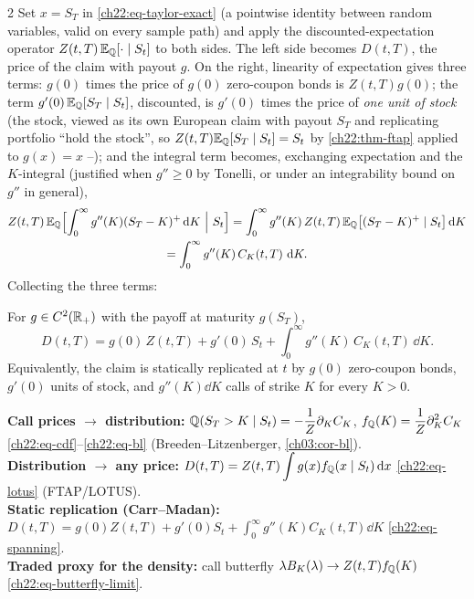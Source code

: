 \begin{paracol}{2}
Set $x=S_T$ in \eqref{ch22:eq-taylor-exact} (a pointwise identity between random variables, valid on
every sample path) and apply the discounted-expectation operator $Z(t,T)\,\mathbb{E}_{\mathbb{Q}}[\cdot\mid S_t]$ to both
sides. The left side becomes $D(t,T)$, the price of the claim with payout $g$. On the right,
linearity of expectation gives three terms: $g(0)$ times the price of $g(0)$ zero-coupon bonds is
$Z(t,T)g(0)$; the term $g'(0)\,\mathbb{E}_{\mathbb{Q}}[S_T\mid S_t]$, discounted, is $g'(0)$ times the price of \emph{one
unit of stock} (the stock, viewed as its own European claim with payout $S_T$ and replicating portfolio
``hold the stock'', so $Z(t,T)\mathbb{E}_{\mathbb{Q}}[S_T\mid S_t]=S_t$ by \cref{ch22:thm-ftap} applied to $g(x)=x$
--); and the integral term becomes, exchanging expectation and
the $K$-integral (justified when $g''\ge0$ by Tonelli, or under an integrability bound on $g''$ in
general),
\[
  \begin{gathered}
  Z(t,T)\,\E_\Q\Bigl[\int_0^\infty g''(K)(S_T-K)^+\dd K\ \Big|\ S_t\Bigr]
  = \int_0^\infty g''(K)\,Z(t,T)\,\E_\Q\bigl[(S_T-K)^+\mid S_t\bigr]\dd K \\
  = \int_0^\infty g''(K)\,C_K(t,T)\,\dd K.
  \end{gathered}
\]
Collecting the three terms:

\begin{theorem}\label{ch22:thm-spanning}
For $g\in C^2(\mathbb{R}_+)$ with the payoff at maturity $g(S_T)$,
\begin{equation}\label{ch22:eq-spanning}
  D(t,T) = g(0)\,Z(t,T) + g'(0)\,S_t + \int_0^\infty g''(K)\,C_K(t,T)\,\dd K.
\end{equation}
Equivalently, the claim is statically replicated at $t$ by $g(0)$ zero-coupon bonds, $g'(0)$ units of
stock, and $g''(K)\dd K$ calls of strike $K$ for every $K>0$.
\end{theorem}

\begin{keyformulas}
\textbf{Call prices $\to$ distribution:} $\displaystyle \mathbb{Q}(S_T>K\mid S_t)=-\frac1{Z}\partial_KC_K$,
\quad $\displaystyle f_{\mathbb{Q}}(K)=\frac1{Z}\partial^2_KC_K$ \eqref{ch22:eq-cdf}--\eqref{ch22:eq-bl}
(Breeden--Litzenberger, \cref{ch03:cor-bl}). \\
\textbf{Distribution $\to$ any price:} $\displaystyle D(t,T)=Z(t,T)\int g(x)f_{\mathbb{Q}}(x\mid S_t)\,\mathrm{d} x$
\eqref{ch22:eq-lotus} (FTAP/LOTUS). \\
\textbf{Static replication (Carr--Madan):}
$\displaystyle D(t,T)=g(0)Z(t,T)+g'(0)S_t+\int_0^\infty g''(K)C_K(t,T)\dd K$ \eqref{ch22:eq-spanning}.\\
\textbf{Traded proxy for the density:} call butterfly $\lambda B_K(\lambda)\to Z(t,T)f_{\mathbb{Q}}(K)$
\eqref{ch22:eq-butterfly-limit}.
\end{keyformulas}


\end{paracol}
